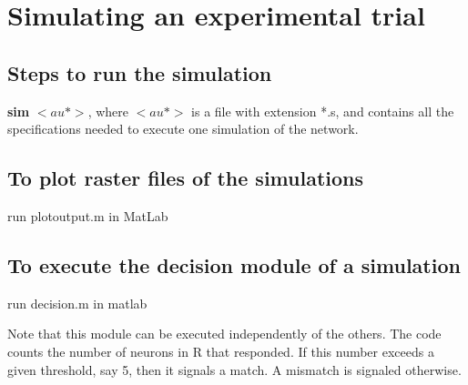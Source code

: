\documentclass[12pt]{article}
\begin{document}
\section{Simulating an experimental trial}

\subsection{Steps to run the simulation}
{\bf sim} $<au*>$,
where $<au*>$ is a file with extension *.s, and contains all the
specifications needed to execute one simulation of the network. 

\subsection{To plot raster files of the simulations}
run plotoutput.m in MatLab

\subsection{To execute the decision module of a simulation}
run decision.m in matlab

Note that this module can be executed independently of the others.
The code counts the number of neurons in R that responded. If this
number exceeds a given threshold, say 5, then it signals a match.
A mismatch is signaled otherwise. 




\appendix

\end{document}
